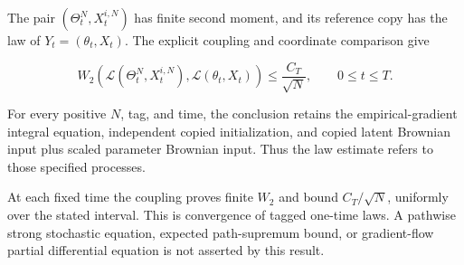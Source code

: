 \documentclass[11pt,a4paper]{report}
\begin{document}
The pair \((\Theta_t^N,X_t^{i,N})\) has finite second moment, and its reference copy has the law of \(Y_t=(\theta_t,X_t)\). The explicit coupling and coordinate comparison give

\[
W_2\!\left(\mathcal L(\Theta_t^N,X_t^{i,N}),\mathcal L(\theta_t,X_t)\right)
 \le\frac{C_T}{\sqrt N},\qquad 0\le t\le T.
\]

For every positive \(N\), tag, and time, the conclusion retains the empirical-gradient integral equation, independent copied initialization, and copied latent Brownian input plus scaled parameter Brownian input. Thus the law estimate refers to those specified processes.



At each fixed time the coupling proves finite \(W_2\) and bound \(C_T/\sqrt N\), uniformly over the stated interval. This is convergence of tagged one-time laws. A pathwise strong stochastic equation, expected path-supremum bound, or gradient-flow partial differential equation is not asserted by this result.
\end{document}
